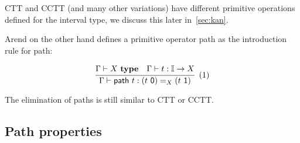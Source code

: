 CTT and CCTT (and many other variations) have different primitive
operations defined for the interval type,
we discuss this later in~\cref{sec:kan}.

Arend on the other hand defines a primitive operator \textsf{path}
as the introduction rule for path:

\[
  \cfrac{
    \Gamma \vdash X \ \textbf{type}
    \quad
    \Gamma \vdash t : \mathbb I \rightarrow X
  }{
    \Gamma \vdash \textsf{path} \ t : (t \ \textsf 0) =_X (t \ \textsf 1)
  }
  \xtag
\]

The elimination of paths is still similar to CTT or CCTT.

\subsection{Path properties}


